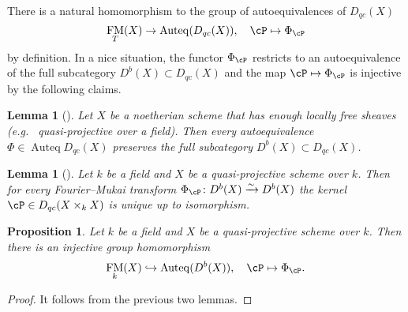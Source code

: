 \documentclass[12pt]{amsart}
\numberwithin{equation}{section}
\theoremstyle{plain}
\newtheorem{lemma}[theorem]{Lemma}
\newtheorem{proposition}[theorem]{Proposition}
\theoremstyle{definition}
\DeclareMathOperator{\Auteq}{\mathrm{Auteq}}
\DeclareMathOperator{\FM}{\mathrm{FM}}
\begin{document}
There is a natural homomorphism to the group of autoequivalences of $D_{qc}(X)$
\begin{equation}\label{eq:FM-to-Auteq}
    \FM_T(X) \to \Auteq(D_{qc}(X)), \quad \cP \mapsto \Phi_{\cP}
\end{equation}
by definition.
In a nice situation, the functor $\Phi_{\cP}$ restricts to an autoequivalence of the full subcategory $D^b(X) \subset D_{qc}(X)$ and the map $\cP \mapsto \Phi_{\cP}$ is injective by the following claims.
\begin{lemma}[{\cite[Proposition 7.4]{MR3861804}}]
    Let $X$ be a noetherian scheme that has enough locally free sheaves (e.g.~ quasi-projective over a field).
    Then every autoequivalence $\Phi \in \Auteq D_{qc}(X)$ preserves the full subcategory $D^b(X) \subset D_{qc}(X)$.
\end{lemma}
\begin{lemma}[{\cite[Theorem 1.5]{MR3556457}}]\label{lem:uniqueness-of-FM-kernel}
    Let $k$ be a field and $X$ be a quasi-projective scheme over $k$.
    Then for every Fourier--Mukai transform $\Phi_{\cP} \colon D^b(X) \xrightarrow{\sim} D^b(X)$ the kernel $\cP \in D_{qc}(X \times_k X)$ is unique up to isomorphism.
\end{lemma}
\begin{proposition}\label{prop:FM-to-Auteq}
    Let $k$ be a field and $X$ be a quasi-projective scheme over $k$.
    Then there is an injective group homomorphism
    \begin{equation}
        \FM_k(X) \hookrightarrow \Auteq(D^b(X)), \quad \cP \mapsto \Phi_{\cP}.
    \end{equation}
\end{proposition}
\begin{proof}
    It follows from the previous two lemmas.
\end{proof}
\end{document}
